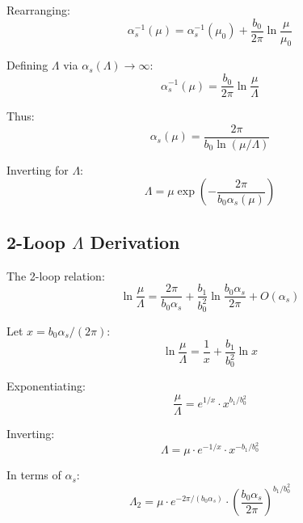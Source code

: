 \documentclass[11pt,a4paper]{article}
\theoremstyle{definition}
\begin{document}
Rearranging:
\begin{equation}
\label{eq:app-4}
\alpha_s^{-1}(\mu) = \alpha_s^{-1}(\mu_0) + \frac{b_0}{2\pi}\ln\frac{\mu}{\mu_0}
\end{equation}

Defining $\Lambda$ via $\alpha_s(\Lambda) \to \infty$:
\begin{equation}
\label{eq:app-5}
\alpha_s^{-1}(\mu) = \frac{b_0}{2\pi}\ln\frac{\mu}{\Lambda}
\end{equation}

Thus:
\begin{equation}
\label{eq:app-6}
\alpha_s(\mu) = \frac{2\pi}{b_0\ln(\mu/\Lambda)}
\end{equation}

Inverting for $\Lambda$:
\begin{equation}
\label{eq:app-7}
\Lambda = \mu\exp\left(-\frac{2\pi}{b_0\alpha_s(\mu)}\right)
\end{equation}

\subsection{2-Loop $\Lambda$ Derivation}
\label{subsec:app-2loop}

The 2-loop relation:
\begin{equation}
\label{eq:app-8}
\ln\frac{\mu}{\Lambda} = \frac{2\pi}{b_0\alpha_s} + \frac{b_1}{b_0^2}\ln\frac{b_0\alpha_s}{2\pi} + O(\alpha_s)
\end{equation}

Let $x = b_0\alpha_s/(2\pi)$:
\begin{equation}
\label{eq:app-9}
\ln\frac{\mu}{\Lambda} = \frac{1}{x} + \frac{b_1}{b_0^2}\ln x
\end{equation}

Exponentiating:
\begin{equation}
\label{eq:app-10}
\frac{\mu}{\Lambda} = e^{1/x} \cdot x^{b_1/b_0^2}
\end{equation}

Inverting:
\begin{equation}
\label{eq:app-11}
\Lambda = \mu \cdot e^{-1/x} \cdot x^{-b_1/b_0^2}
\end{equation}

In terms of $\alpha_s$:
\begin{equation}
\label{eq:app-12}
\Lambda_2 = \mu \cdot e^{-2\pi/(b_0\alpha_s)} \cdot \left(\frac{b_0\alpha_s}{2\pi}\right)^{b_1/b_0^2}
\end{equation}
\end{document}
